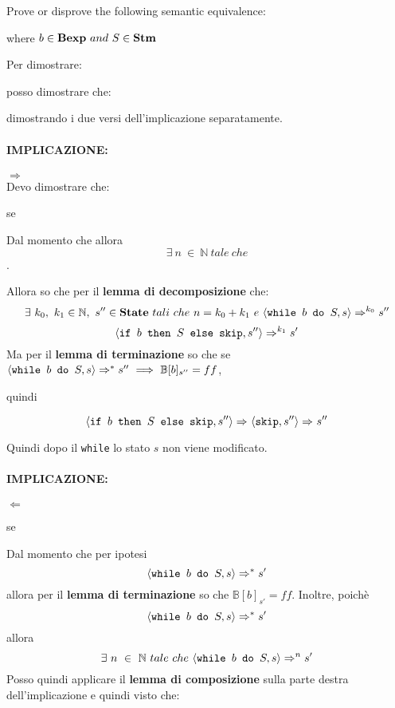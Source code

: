 {
	Prove or disprove the following semantic equivalence:
	\begin{center}
	\exFive{}
	\end{center}
	where $b\in\mbox{\textbf{Bexp}}~and~S\in\mbox{\textbf{Stm}}$
}
{
	Per dimostrare:
	\begin{center}
	\exFive{}
	\end{center}
	posso dimostrare che:
	\begin{center}
	\exFiveIff{}
	\end{center}
	dimostrando i due versi dell'implicazione separatamente.\\

	\paragraph{IMPLICAZIONE: }  $\Longrightarrow{}$ \\
	Devo dimostrare che:
	\begin{center}
	se \exFiveLtR{}
	\end{center}
	Dal momento che \exFiveR{*} allora 
	\[ \exists~n~\in~\mathbb{N}~tale~che \]
	.
	
	Allora so che per il \textbf{lemma di decomposizione} che:
	\[ \exists{}~k_0,~k_1\in\mathbb{N},~s''\in\mbox{\textbf{State}}~tali~che~n=k_0+k_1~e~
	\langle{}\mbox{\normalfont{\texttt{while }}} b \textrm{\normalfont{\texttt{ do }}} S, s\rangle{}\Rightarrow^{k_0}s'' \]
	\[ \langle{}\mbox{\normalfont{\texttt{if }}} b \textrm{\normalfont{\texttt{ then }}} S \textrm{\normalfont{\texttt{ else }}} \textrm{\normalfont{\texttt{skip}}}, s''\rangle{}\Rightarrow^{k_1}s' \] 
	Ma per il \textbf{lemma di terminazione} so che 
	se 
	$\langle{}\mbox{\normalfont{\texttt{while }}} b \textrm{\normalfont{\texttt{ do }}} S, s\rangle{}\Rightarrow^{*}s''~\Longrightarrow{}~\mathbb{B}[b]_{s''}=ff$,

	quindi 

	\[ \langle{}\mbox{\normalfont{\texttt{if }}} b \textrm{\normalfont{\texttt{ then }}} S \textrm{\normalfont{\texttt{ else }}} \textrm{\normalfont{\texttt{skip}}}, s''\rangle{}\Rightarrow^{}
	\langle{}\textrm{\normalfont{\texttt{skip}}}, s''\rangle{}\Rightarrow^{}s'' \]

	Quindi dopo il \texttt{while} lo stato $s$ non viene modificato.\\

	\paragraph{IMPLICAZIONE: } $\Longleftarrow{}$\\
	\begin{center}
	se \exFiveRtL{}
	\end{center}
	Dal momento che per ipotesi 
	\[ \langle{}\mbox{\normalfont{\texttt{while }}} b \textrm{\normalfont{\texttt{ do }}} S, s\rangle{}\Rightarrow^{*}{s'} \] 
	allora
	per il \textbf{lemma di terminazione} so che $\mathbb{B}[b]_{s'}=ff$.
	Inoltre, poichè 
	\[ \langle{}\mbox{\normalfont{\texttt{while }}} b \textrm{\normalfont{\texttt{ do }}} S, s\rangle{}\Rightarrow^{*}{s'} \]
	 allora 
	\[ \exists~n~\in~\mathbb{N}~tale~che~\langle{}\mbox{\normalfont{\texttt{while }}} b \textrm{\normalfont{\texttt{ do }}} S, s\rangle{}\Rightarrow^{n}{s'} \]
	Posso quindi applicare il \textbf{lemma di composizione} sulla parte destra
	dell'implicazione e quindi visto che:
	
}
